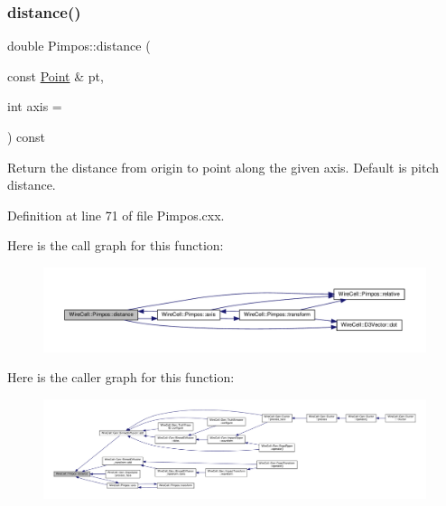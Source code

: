 \subsubsection{\texorpdfstring{distance()}{distance()}}
{\footnotesize\ttfamily double Pimpos\+::distance (\begin{DoxyParamCaption}\item[{const \hyperlink{namespace_wire_cell_ab2b2565fa6432efbb4513c14c988cda9}{Point} \&}]{pt,  }\item[{int}]{axis = {} }\end{DoxyParamCaption}) const}

Return the distance from origin to point along the given axis. Default is pitch distance. 

Definition at line 71 of file Pimpos.\+cxx.

Here is the call graph for this function\+:
\nopagebreak
\begin{figure}[H]
\begin{center}
\leavevmode
\includegraphics[width=350pt]{class_wire_cell_1_1_pimpos_abeadf8b503815d0dbfaf5d94d245b5bd_cgraph}
\end{center}
\end{figure}
Here is the caller graph for this function\+:
\nopagebreak
\begin{figure}[H]
\begin{center}
\leavevmode
\includegraphics[width=350pt]{class_wire_cell_1_1_pimpos_abeadf8b503815d0dbfaf5d94d245b5bd_icgraph}
\end{center}
\end{figure}
\mbox{\label{class_wire_cell_1_1_pimpos_a1b8aef1ec7d1cf9eb9d5d78a6359e2aa}} 
